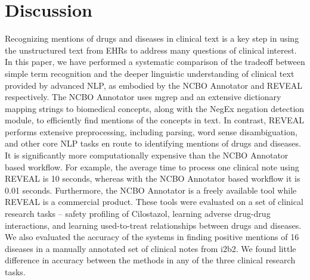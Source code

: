 \section{Discussion}
Recognizing mentions of drugs and diseases in clinical text is a key
step in using the unstructured text from EHRs to address many
questions of clinical interest.  In this paper, we have performed a
systematic comparison of the tradeoff between simple term recognition
and the deeper linguistic understanding of clinical text provided by
advanced NLP, as embodied by the NCBO Annotator and REVEAL
respectively.  The NCBO Annotator uses mgrep and an extensive
dictionary mapping strings to biomedical concepts, along with the
NegEx negation detection module, to efficiently find mentions of the
concepts in text.  In contrast, REVEAL performs extensive
preprocessing, including parsing, word sense disambiguation, and other
core NLP tasks en route to identifying mentions of drugs and diseases.
It is significantly more computationally expensive than the NCBO
Annotator based workflow. For example, the average time to process one
clinical note using REVEAL is 10 seconds, whereas with the NCBO
Annotator based workflow it is 0.01 seconds.  Furthermore, the NCBO
Annotator is a freely available tool while REVEAL is a commercial
product.  These tools were evaluated on a set of clinical research
tasks – safety profiling of Cilostazol, learning adverse drug-drug
interactions, and learning used-to-treat relationships between drugs
and diseases.  We also evaluated the accuracy of the systems in
finding positive mentions of 16 diseases in a manually annotated set
of clinical notes from i2b2.  We found little difference in accuracy
between the methods in any of the three clinical research tasks.

